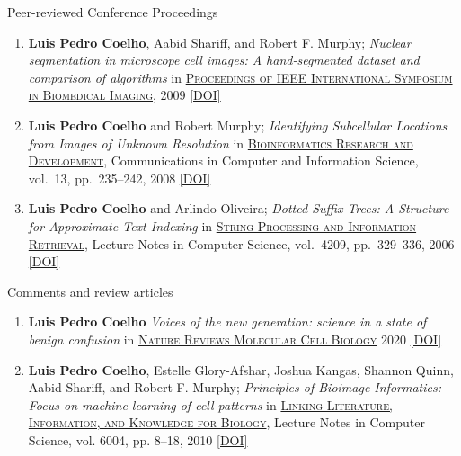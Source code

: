 \documentclass{article}
\renewcommand\subsubsection[1]{%
    \par\vspace{.1em}%
    {\hspace{1em}\subsubsubhead #1}%
    \par\vspace{.2em}%
}
\newcommand\showdoi[1]{%
    \href{http://dx.doi.org/#1}{[DOI]}%
}
\newcommand\pubname[1]{\textsc{\uline{#1}}}
\newcommand\contribution[1]{\relax}
\begin{document}
\subsubsection{Peer-reviewed Conference Proceedings}

\begin{enumerate}[resume]
\item \textbf{Luis Pedro Coelho}, Aabid Shariff, and Robert F. Murphy;
\emph{Nuclear segmentation in microscope cell images: A hand-segmented dataset
and comparison of algorithms} in \pubname{Proceedings of IEEE International
Symposium in Biomedical Imaging}, 2009 \showdoi{10.1109/ISBI.2009.5193098}
\contribution{I acquired (part of) the microscopy data, built the
hand-segmented dataset, implemented the methods and wrote the first draft of
the manuscript.}


\item \textbf{Luis Pedro Coelho} and Robert Murphy; \emph{Identifying
Subcellular Locations from Images of Unknown Resolution} in
\pubname{Bioinformatics Research and Development}, Communications in Computer
and Information Science, vol.\ 13, pp.\ 235--242, 2008
\showdoi{10.1007/978-3-540-70600-7_18}
\contribution{I implemented the algorithm, ran the tests, and wrote the first
draft of the paper.}

\item \textbf{Luis Pedro Coelho} and Arlindo Oliveira; \emph{Dotted Suffix
Trees: A Structure for Approximate Text Indexing} in \pubname{String Processing
and Information Retrieval}, Lecture Notes in Computer Science, vol.\ 4209, pp.\
329--336, 2006 \showdoi{10.1007/11880561_27}
\contribution{I developed and implemented the algorithm and wrote the first
draft of the manuscript.}

\end{enumerate}

\subsubsection{Comments and review articles}

\begin{enumerate}[resume]

\item \textbf{Luis Pedro Coelho} \emph{Voices of the new generation: science in
a state of benign confusion} in \pubname{Nature Reviews Molecular Cell Biology}
2020 \showdoi{10.1038/s41580-020-0265-5}

\item \textbf{Luis Pedro Coelho}, Estelle Glory-Afshar, Joshua Kangas, Shannon
Quinn, Aabid Shariff, and Robert F. Murphy; \emph{Principles of Bioimage
Informatics: Focus on machine learning of cell patterns} in \pubname{Linking
Literature, Information, and Knowledge for Biology}, Lecture Notes in Computer
Science, vol.  6004, pp. 8--18, 2010 \showdoi{10.1007/978-3-642-13131-8_2}

\end{enumerate}
\end{document}
